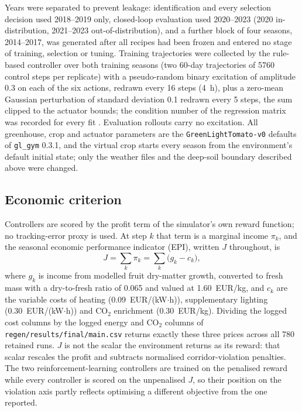 Years were separated to prevent leakage: identification and
every selection decision used 2018--2019 only, closed-loop evaluation used 2020--2023 (2020 in-distribution,
2021--2023 out-of-distribution), and a further block of four seasons, 2014--2017, was
generated after all recipes had been frozen and entered no stage of training, selection
or tuning. Training trajectories were collected by the rule-based controller over both
training seasons (two 60-day trajectories of 5760 control steps per replicate) with a
pseudo-random binary excitation of amplitude 0.3 on each of the six actions, redrawn every
16 steps (4~h), plus a zero-mean Gaussian perturbation of standard deviation 0.1 redrawn
every 5 steps, the sum clipped to the actuator bounds; the condition number of the
regression matrix was recorded for every fit \cite{cortiella2021}. Evaluation rollouts
carry no excitation. All greenhouse, crop and actuator parameters are the
\texttt{GreenLightTomato-v0} defaults of \texttt{gl\_gym} 0.3.1, and the virtual crop
starts every season from the environment's default initial state; only the weather files
and the deep-soil boundary described above were changed.

\subsection{Economic criterion}
\label{sec:epi}

Controllers are scored by the profit term of the simulator's own reward function; no
tracking-error proxy is used. At step $k$ that term is a marginal income $\pi_k$, and the
seasonal economic performance indicator (EPI), written $J$ throughout, is
%
\begin{equation}
J=\sum_{k}\pi_k=\sum_{k}\bigl(g_k-c_k\bigr),
\end{equation}
%
where $g_k$ is income from modelled fruit dry-matter growth, converted to fresh mass
with a dry-to-fresh ratio of 0.065 and valued at 1.60~EUR/kg, and $c_k$ are the
variable costs of heating (0.09~EUR/(kW$\cdot$h)), supplementary lighting
(0.30~EUR/(kW$\cdot$h)) and CO$_2$ enrichment (0.30~EUR/kg). Dividing the logged cost
columns by the logged energy and CO$_2$ columns of
\texttt{regen/results/final/main.csv} returns exactly these three prices across all 780
retained runs. $J$ is not the scalar the environment returns as its reward: that
scalar rescales the profit and subtracts normalised corridor-violation penalties. The
two reinforcement-learning controllers are trained on the penalised reward while every
controller is scored on the unpenalised $J$, so their position on the violation axis
partly reflects optimising a different objective from the one reported.

